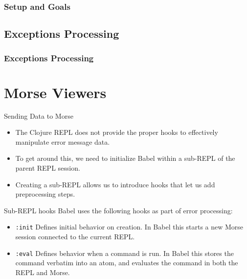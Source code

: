 \documentclass{beamer}
\begin{document}
\begin{frame}
\frametitle{Setup and Goals}

\end{frame}

\subsection{Exceptions Processing}

\begin{frame}
\frametitle{Exceptions Processing}

\end{frame}

\section{Morse Viewers}

\begin{frame}{Sending Data to Morse}
  \begin{itemize}
    \item<1-> The Clojure REPL does not provide the proper hooks to effectively manipulate error message data.
    \item<2-> To get around this, we need to initialize Babel within a sub-REPL of the parent REPL session.
    \item<3-> Creating a sub-REPL allows us to introduce hooks that let us add preprocessing steps.
  \end{itemize}
\end{frame}

\begin{frame}{Sub-REPL hooks}
  Babel uses the following hooks as part of error processing:
  \begin{itemize}
    \item<1-> \texttt{:init} Defines initial behavior on creation. In Babel this starts a new Morse session connected to the current REPL.
    \item<2-> \texttt{:eval} Defines behavior when a command is run. In Babel this stores the command verbatim into an atom, and evaluates the command in both the REPL and Morse.  
  \end{itemize}
\end{frame}
\end{document}
